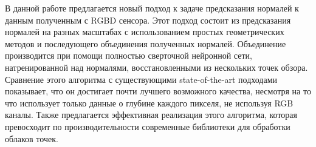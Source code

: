 В данной работе предлагается новый подход к задаче предсказания нормалей к данным полученным с RGBD сенсора. Этот подход состоит из предсказания нормалей на разных масштабах с использованием простых геометрических методов и последующего объединения полученных нормалей. Объединение производится при помощи полностью сверточной нейронной сети, натренированной над нормалями, восстановленными из нескольких точек обзора. Сравнение этого алгоритма с существующими state-of-the-art подходами показывает, что он достигает почти лучшего возможного качества, несмотря на то что использует только данные о глубине каждого пикселя, не используя RGB каналы. Также предлагается эффективная реализация этого алгоритма, которая превосходит по производительности современные библиотеки для обработки облаков точек.